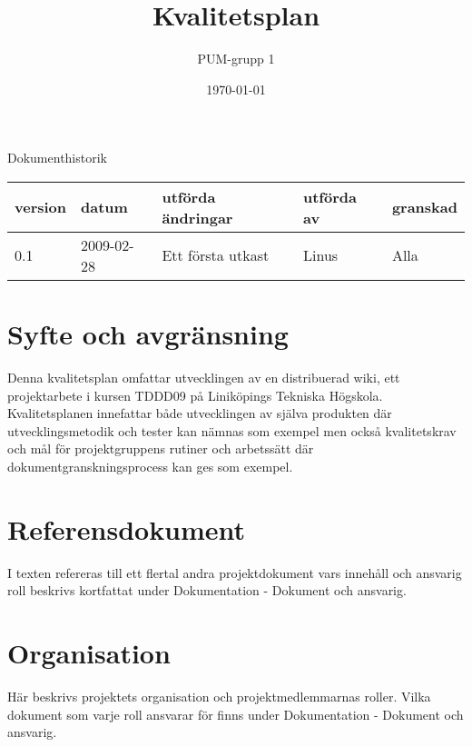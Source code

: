 

\ifpdf
\else
\fi

\title{Kvalitetsplan}
\author{PUM-grupp 1}
\date{\today}



\maketitle\thispagestyle{empty}
\newpage

{\centering \Large{Dokumenthistorik\\}}

\vspace{10pt}
\begin{tabularx}{\textwidth}{ |l|l|X|l|l| }
  \hline
    \textbf{version} & \textbf{datum} & \textbf{utförda ändringar} & \textbf{utförda av} & \textbf{granskad} \\
	\hline 
  0.1 & 2009-02-28 &  Ett första utkast  & Linus & Alla \\
  \hline
\end{tabularx}

\newpage

\setcounter{tocdepth}{2}
\tableofcontents
\newpage

\section{Syfte och avgränsning}
Denna kvalitetsplan omfattar utvecklingen av en distribuerad wiki, ett projektarbete i kursen TDDD09 på Liniköpings Tekniska Högskola. Kvalitetsplanen innefattar både utvecklingen av själva produkten där utvecklingsmetodik och tester kan nämnas som exempel men också kvalitetskrav och mål för projektgruppens rutiner och arbetssätt där dokumentgranskningsprocess kan ges som exempel. 

\section{Referensdokument}
I texten refereras till ett flertal andra projektdokument vars innehåll och ansvarig roll beskrivs kortfattat under Dokumentation - Dokument och ansvarig. 

\section{Organisation}
Här beskrivs projektets organisation och projektmedlemmarnas roller. Vilka dokument som varje roll ansvarar för finns under Dokumentation - Dokument och ansvarig.

